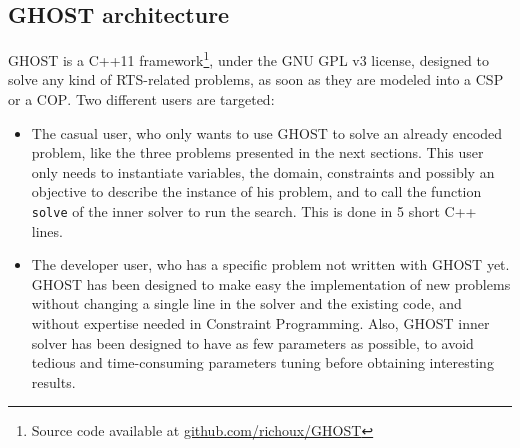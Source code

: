 \documentclass[journal]{IEEEtran}
\newcommand{\csp}{\textsc{CSP}\xspace}
\newcommand{\cop}{\textsc{COP}\xspace}
\newcommand{\ghost}{\textsc{GHOST}\xspace}
\begin{document}
\subsection{\ghost architecture}

\ghost  is a  C++11 framework\footnote{Source  code available  at
  \href{https://github.com/richoux/GHOST}{github.com/richoux/GHOST}},
under  the  GNU  GPL  v3  license,  designed  to  solve  any  kind  of
RTS-related problems,  as soon as  they are modeled  into a \csp  or a
\cop. Two different users are targeted:
\begin{itemize}
\item  The casual  user, who  only  wants to  use \ghost  to solve  an
  already encoded problem,  like the three problems  presented in the next
  sections.   This  user  only  needs to  instantiate  variables,  the
  domain,  constraints and possibly  an objective  to describe  the
  instance of his problem, and  to call the function \texttt{solve} of
  the inner solver to run the search. This is done in 5 short C++ lines.
\item The developer user, who has  a specific problem not written with
  \ghost yet.  \ghost  has been designed to make easy the implementation of
  new problems without changing a single line in  the solver and
  the  existing  code,  and  without expertise  needed  in  Constraint
  Programming.   Also, \ghost inner  solver has  been designed  to have  as few
  parameters  as   possible,  to  avoid  tedious   and  time-consuming
  parameters tuning before obtaining interesting results.
\end{itemize}
\end{document}
